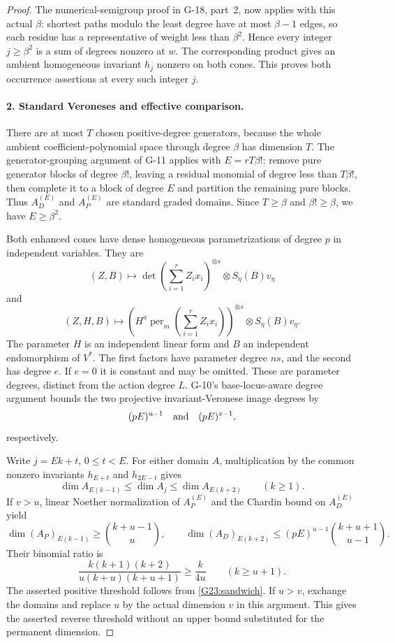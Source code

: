 \begin{proof}
The numerical-semigroup proof in G-18, part~2, now applies
with this actual $\beta$: shortest paths modulo the least
degree have at most $\beta-1$ edges, so each residue has a
representative of weight less than $\beta^2$. Hence every
integer $j\ge\beta^2$ is a sum of degrees nonzero at $w$.
The corresponding product gives an ambient homogeneous
invariant $h_j$ nonzero on both cones. This proves both
occurrence assertions at every such integer $j$.

\paragraph{2. Standard Veroneses and effective comparison.}
There are at most $T$ chosen positive-degree generators,
because the whole ambient coefficient-polynomial space
through degree $\beta$ has dimension $T$.
The generator-grouping argument of G-11 applies with
$E=rT\beta!$: remove pure generator blocks of degree
$\beta!$, leaving a residual monomial of degree less than
$T\beta!$, then complete it to a block of degree $E$ and
partition the remaining pure blocks. Thus $A_D^{(E)}$ and
$A_P^{(E)}$ are standard graded domains. Since $T\ge\beta$
and $\beta!\ge\beta$, we have $E\ge\beta^2$.

Both enhanced cones have dense homogeneous parametrizations
of degree $p$ in independent variables. They are
\[
 (Z,B)\longmapsto\det\left(\sum_{i=1}^r Z_i x_i\right)^{\otimes s}
                  \otimes S_\eta(B)v_\eta
\]
and
\[
 (Z,H,B)\longmapsto
 \left(H^a\operatorname{per}_m\left(\sum_{i=1}^rZ_i x_i\right)\right)^{\otimes s}
                  \otimes S_\eta(B)v_\eta.
\]
The parameter $H$ is an independent linear form and $B$ an
independent endomorphism of $V^*$. The first factors have
parameter degree $ns$, and the second has degree $e$.
If $e=0$ it is constant and may be omitted. These are parameter
degrees, distinct from the action degree $L$.
G-10's base-locus-aware degree argument bounds the two
projective invariant-Veronese image degrees by
\[
 (pE)^{u-1}\quad\hbox{and}\quad(pE)^{v-1},
\]
respectively.

Write $j=Ek+t$, $0\le t<E$. For either domain $A$, multiplication
by the common nonzero invariants $h_{E+t}$ and $h_{2E-t}$ gives
\begin{equation}\label{G23:sandwich}
 \dim A_{E(k-1)}\le\dim A_j\le\dim A_{E(k+2)}\qquad(k\ge1).
\end{equation}
If $v>u$, linear Noether normalization of $A_P^{(E)}$ and
the Chardin bound on $A_D^{(E)}$ yield
\[
 \dim(A_P)_{E(k-1)}\ge\binom{k+u-1}{u},\qquad
 \dim(A_D)_{E(k+2)}\le(pE)^{u-1}\binom{k+u+1}{u-1}.
\]
Their binomial ratio is
\[
 \frac{k(k+1)(k+2)}{u(k+u)(k+u+1)}
                 \ge\frac{k}{4u}\qquad(k\ge u+1).
\]
The asserted positive threshold follows from
\eqref{G23:sandwich}. If $u>v$, exchange the domains and
replace $u$ by the actual dimension $v$ in this argument.
This gives the asserted reverse threshold without an upper
bound substituted for the permanent dimension.


\end{proof}
